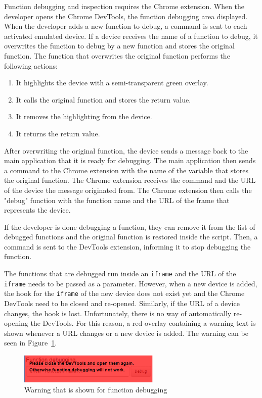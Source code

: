 Function debugging and inspection requires the Chrome extension. When the developer opens the Chrome DevTools, the function debugging area displayed. When the developer adds a new function to debug, a command is sent to each activated emulated device. If a device receives the name of a function to debug, it overwrites the function to debug by a new function and stores the original function. The function that overwrites the original function performs the following actions:
\begin{enumerate}
	\item It highlights the device with a semi-transparent green overlay.
	\item It calls the original function and stores the return value.
	\item It removes the highlighting from the device.
	\item It returns the return value.
\end{enumerate}
After overwriting the original function, the device sends a message back to the main application that it is ready for debugging. The main application then sends a command to the Chrome extension with the name of the variable that stores the original function. The Chrome extension receives the command and the URL of the device the message originated from. The Chrome extension then calls the "debug" function with the function name and the URL of the frame that represents the device.

If the developer is done debugging a function, they can remove it from the list of debugged functions and the original function is restored inside the script. Then, a command is sent to the DevTools extension, informing it to stop debugging the function. 

The functions that are debugged run inside an \lstinline|iframe| and the URL of the \lstinline|iframe| needs to be passed as a parameter. However, when a new device is added, the hook for the \lstinline|iframe| of the new device does not exist yet and the Chrome DevTools need to be closed and re-opened. Similarly, if the URL of a device changes, the hook is lost. Unfortunately, there is no way of automatically re-opening the DevTools. For this reason, a red overlay containing a warning text is shown whenever a URL changes or a new device is added. The warning can be seen in Figure~\ref{fig:warning}.

\begin{figure}[H]
  \centering
    \includegraphics[width=0.6\textwidth]{images/screenshots/warning.png}
	\caption[Screenshot: Function debugging warning]{Warning that is shown for function debugging}
	\label{fig:warning}
\end{figure}

